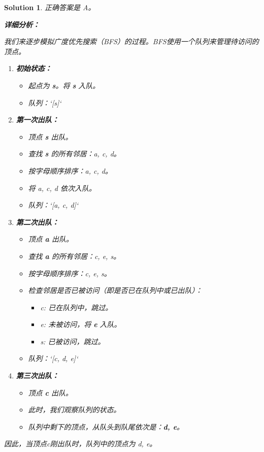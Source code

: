 \documentclass[UTF8]{report}
\newtheorem{solution}{Solution}
\theoremstyle{MyLineTheoremStyle} %
\theoremstyle{MyBlockTheoremStyle} %
\theoremstyle{MySubsubsectionStyle} %
\begin{document}
\begin{solution}
正确答案是 A。

\textbf{详细分析：}

我们来逐步模拟广度优先搜索（BFS）的过程。BFS使用一个队列来管理待访问的顶点。

\begin{enumerate}
    \item \textbf{初始状态：}
    \begin{itemize}
        \item 起点为 \textbf{s}。将 \textbf{s} 入队。
        \item 队列：`[s]`
    \end{itemize}

    \item \textbf{第一次出队：}
    \begin{itemize}
        \item 顶点 \textbf{s} 出队。
        \item 查找 \textbf{s} 的所有邻居：a, c, d。
        \item 按字母顺序排序：a, c, d。
        \item 将 a, c, d 依次入队。
        \item 队列：`[a, c, d]`
    \end{itemize}

    \item \textbf{第二次出队：}
    \begin{itemize}
        \item 顶点 \textbf{a} 出队。
        \item 查找 \textbf{a} 的所有邻居：c, e, s。
        \item 按字母顺序排序：c, e, s。
        \item 检查邻居是否已被访问（即是否已在队列中或已出队）：
            \begin{itemize}
                \item c: 已在队列中，跳过。
                \item e: 未被访问，将 \textbf{e} 入队。
                \item s: 已被访问，跳过。
            \end{itemize}
        \item 队列：`[c, d, e]`
    \end{itemize}

    \item \textbf{第三次出队：}
    \begin{itemize}
        \item 顶点 \textbf{c} 出队。
        \item 此时，我们观察队列的状态。
        \item 队列中剩下的顶点，从队头到队尾依次是：\textbf{d, e}。
    \end{itemize}
\end{enumerate}

因此，当顶点c刚出队时，队列中的顶点为 d, e。
\end{solution}
\end{document}
